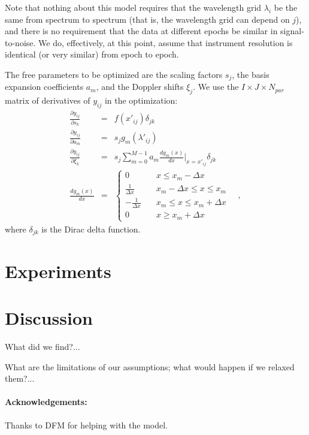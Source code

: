 \documentclass[12pt, letterpaper]{article}
\newcommand{\given}{\,|\,}
\newcommand{\normal}{{\mathcal{N}}}
\begin{document}
Note that nothing about this model requires that the wavelength grid
$\lambda_i$ be the same from spectrum to spectrum (that is, the
wavelength grid can depend on $j$), and there is no requirement that
the data at different epochs be similar in signal-to-noise. We do,
effectively, at this point, assume that instrument resolution is
identical (or very similar) from epoch to epoch.

The free parameters to be optimized are the scaling factors $s_j$, the basis expansion
coefficients $a_m$, and the Doppler shifts $\xi_j$. We use the $I\times J\times N_{par}$ matrix 
of derivatives of $y_{ij}$ in the optimization:
\begin{eqnarray}
  \frac{\partial y_{ij}}{\partial s_k} &=& f(x'_{ij}) \delta_{jk}
  \\
  \frac{\partial y_{ij}}{\partial a_m} &=& s_j g_m(\lambda'_{ij})
  \\
  \frac{\partial y_{ij}}{\partial \xi_k}  &=& 
  s_j \sum_{m=0}^{M-1} a_m \frac{dg_m(x)}{dx}\bigg\rvert_{x=x'_{ij}} 
  \delta_{jk}
  \\
    \frac{dg_m(x)}{dx} &=& \left\{
        \begin{array}{ll}
            0 & \quad x \leq x_m -\Delta x \\
            \frac{1}{\Delta x} & \quad x_m - \Delta x \leq x \leq x_m \\
            - \frac{1}{\Delta x} & \quad x_m \leq x \leq x_m + \Delta x \\
            0 & \quad x \geq x_m + \Delta x
        \end{array}
    \right.
  \quad ,
\end{eqnarray}
where $\delta_{jk}$ is the Dirac delta function.

\section{Experiments}

\section{Discussion}

What did we find?...

What are the limitations of our assumptions; what would happen if we relaxed them?...

\paragraph{Acknowledgements:}
Thanks to DFM for helping with the model.
\end{document}

